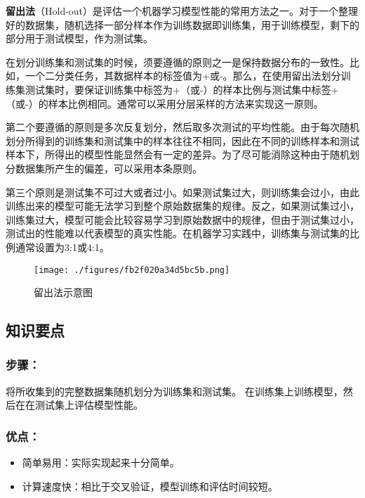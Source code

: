 

\textbf{留出法}（Hold-out）是评估一个机器学习模型性能的常用方法之一。对于一个整理好的数据集，随机选择一部分样本作为训练数据即训练集，用于训练模型，剩下的部分用于测试模型，作为测试集。

在划分训练集和测试集的时候，须要遵循的原则之一是保持数据分布的一致性。比如，一个二分类任务，其数据样本的标签值为+或-。那么，在使用留出法划分训练集测试集时，要保证训练集中标签为+（或-）的样本比例与测试集中标签+（或-）的样本比例相同。通常可以采用分层采样的方法来实现这一原则。

第二个要遵循的原则是多次反复划分，然后取多次测试的平均性能。由于每次随机划分所得到的训练集和测试集中的样本往往不相同，因此在不同的训练样本和测试样本下，所得出的模型性能显然会有一定的差异。为了尽可能消除这种由于随机划分数据集所产生的偏差，可以采用本条原则。

第三个原则是测试集不可过大或者过小。如果测试集过大，则训练集会过小，由此训练出来的模型可能无法学习到整个原始数据集的规律。反之，如果测试集过小，训练集过大，模型可能会比较容易学习到原始数据中的规律，但由于测试集过小，测试出的性能难以代表模型的真实性能。在机器学习实践中，训练集与测试集的比例通常设置为3:1或4:1。


\begin{figure}[ht]
\centering
\texttt{[image: ./figures/fb2f020a34d5bc5b.png]}
\caption{留出法示意图} \label{fig_holdou_1}
\end{figure}


\subsection{知识要点}
\subsubsection{步骤：}
将所收集到的完整数据集随机划分为训练集和测试集。
在训练集上训练模型，然后在在测试集上评估模型性能。

\subsubsection{优点：}
\begin{itemize}
\item 简单易用：实际实现起来十分简单。
\item 计算速度快：相比于交叉验证，模型训练和评估时间较短。
\end{itemize}

